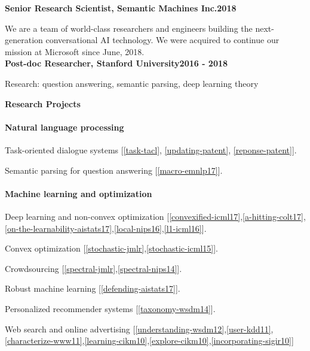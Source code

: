 \documentclass{res}
\newenvironment{my_item}{
\begin{itemize}
  \setlength{\itemsep}{0pt}
  \setlength{\parskip}{0pt}
  \setlength{\parsep}{0pt}}
{\end{itemize}
}
\begin{document}
\begin{resume}
\begin{my_item}
\end{my_item}
\vspace{-5pt}
{\bf Senior Research Scientist, Semantic Machines Inc.}\hfill\textbf{2018}
\vspace{-10pt}

We are a team of world-class researchers and engineers building the next-generation conversational AI technology. We were acquired to continue our mission at Microsoft since June, 2018.\vspace{5pt}\\
{\bf Post-doc Researcher, Stanford University}\hfill\textbf{2016 - 2018}
\vspace{-10pt}

{Research: question answering, semantic parsing, deep learning theory}\vspace{5pt}\\
\vspace{-10pt}

{\bf\Large Research Projects}

\paragraph{Natural language processing}
\begin{my_item}
\item Task-oriented dialogue systems [\ref{task-tacl}, \ref{updating-patent}, \ref{reponse-patent}].
\item Semantic parsing for question answering [\ref{macro-emnlp17}].
\end{my_item}

\vspace{-5pt}
\paragraph{Machine learning and optimization}
\begin{my_item}
\item Deep learning and non-convex optimization [\ref{convexified-icml17},\ref{a-hitting-colt17},\ref{on-the-learnability-aistats17},\ref{local-nips16},\ref{l1-icml16}].
\item Convex optimization [\ref{stochastic-jmlr},\ref{stochastic-icml15}].
\item Crowdsourcing [\ref{spectral-jmlr},\ref{spectral-nips14}].
\item Robust machine learning [\ref{defending-aistats17}].
\item Personalized recommender systems [\ref{taxonomy-wsdm14}].
\item Web search and online advertising [\ref{understanding-wsdm12},\ref{user-kdd11},\ref{characterize-www11},\ref{learning-cikm10},\ref{explore-cikm10},\ref{incorporating-sigir10}]
\end{my_item}


\end{resume}
\end{document}
